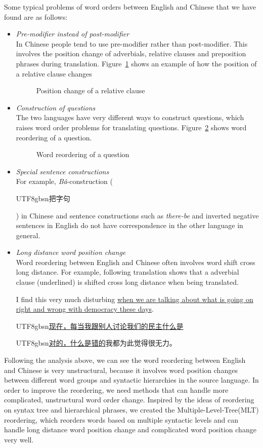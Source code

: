 \documentclass[a4paper]{article}
\newcommand{\cntext}[1]{\begin{CJK}{UTF8}{gbsn}#1\end{CJK}}
\begin{document}
Some typical problems of word orders between English and Chinese that we have found are as follows:

\begin{itemize}
\item \emph{Pre-modifier instead of post-modifier}\\ In Chinese people tend to use pre-modifier rather than post-modifier. This involves the position change of adverbials, relative clauses and preposition phrases during translation. Figure~\ref{relative} shows an example of how the position of a relative clause changes
\begin{figure}

\caption{Position change of a relative clause}
\label{relative}
\end{figure}
\item \emph{Construction of questions}\\
The two languages have very different ways to construct questions, which raises word order problems for translating questions. Figure~\ref{question} shows word reordering of a question.
\begin{figure}

\caption{Word reordering of a question}
\label{question}
\end{figure}
\item \emph{Special sentence constructions}\\ For example, \emph{B\^{a}}-construction (\cntext{把字句}) in Chinese and sentence constructions such as \emph{there-be} and inverted negative sentences in English do not have correspondence in the other language in general.
\item \emph{Long distance word position change}\\
Word reordering between English and Chinese often involves word shift cross long distance. For example, following translation shows that a adverbial clause (underlined) is shifted cross long distance when being translated.\bigskip \\
\parbox{0.3705\textwidth}{
I find this very much disturbing \uline{when we are talking about what is going on right and wrong with democracy these days}.\medskip\\
\cntext{\uline{现在，每当我跟别人讨论我们的民主什么是}}
\cntext{\uline{对的，什么是错的}我都为此觉得很无力。}
}
\end{itemize}

Following the analysis above, we can see the word reordering between English and Chinese is very unstructural, because it involves word position changes between different word groups and syntactic hierarchies in the source language. In order to improve the reordering, we need methods that can handle more complicated, unstructural word order change. Inspired by the ideas of reordering on syntax tree and hierarchical phrases, we created the Multiple-Level-Tree(MLT) reordering, which reorders words based on multiple syntactic levels and can handle long distance word position change and complicated word position change very well.
\end{document}
